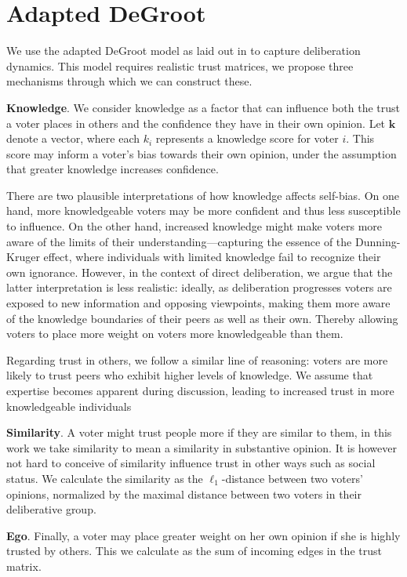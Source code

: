 \section{Adapted DeGroot}
We use the adapted DeGroot model as laid out in  to capture deliberation dynamics. This model requires realistic trust matrices, we propose three mechanisms through which we can construct these.


\textbf{Knowledge}. We consider knowledge as a factor that can influence both the trust a voter places in others and the confidence they have in their own opinion. Let $\boldsymbol{k}$ denote a vector, where each $k_i$ represents a knowledge score for voter $i$. This score may inform a voter's bias towards their own opinion, under the assumption that greater knowledge increases confidence.

There are two plausible interpretations of how knowledge affects self-bias. On
one hand, more knowledgeable voters may be more confident and thus less
susceptible to influence. On the other hand, increased knowledge might make
voters more aware of the limits of their understanding—capturing the essence of
the Dunning-Kruger effect, where individuals with limited knowledge fail to
recognize their own ignorance. However, in the context of direct deliberation,
we argue that the latter interpretation is less realistic: ideally, as
deliberation progresses voters are exposed to new information and opposing
viewpoints, making them more aware of the knowledge boundaries of their peers
as well as their own. Thereby allowing voters to place more weight on voters
more knowledgeable than them.

Regarding trust in others, we follow a similar line of reasoning: voters are
more likely to trust peers who exhibit higher levels of knowledge. We assume
that expertise becomes apparent during discussion, leading to increased
trust in more knowledgeable individuals


\textbf{Similarity}. A voter might trust people more if they are similar to them, in this work we take similarity to mean a similarity in substantive opinion. It is however not hard to conceive of similarity influence trust in other ways such as social status. We calculate the similarity as the $\ell_1$-distance between two voters' opinions, normalized by the maximal distance between two voters in their deliberative group.


\textbf{Ego}. Finally, a voter may place greater weight on her own opinion if
she is highly trusted by others. This we calculate as the sum of incoming edges in the trust matrix.

